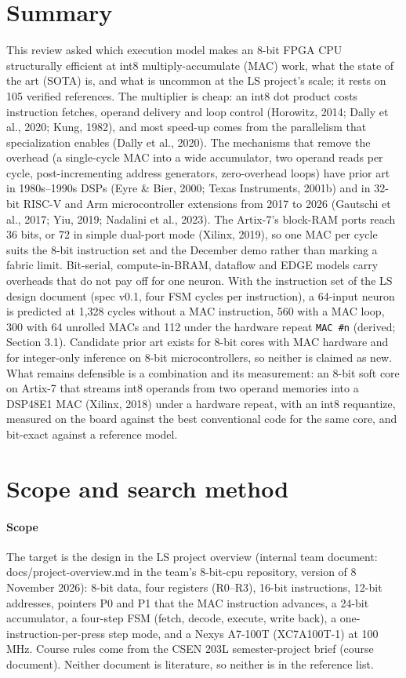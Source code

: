 
\section{Summary}

This review asked which execution model makes an 8-bit FPGA CPU structurally efficient at int8 multiply-accumulate (MAC) work, what the state of the art (SOTA) is, and what is uncommon at the LS project's scale; it rests on 105 verified references. The multiplier is cheap: an int8 dot product costs instruction fetches, operand delivery and loop control (Horowitz, 2014; Dally et al., 2020; Kung, 1982), and most speed-up comes from the parallelism that specialization enables (Dally et al., 2020). The mechanisms that remove the overhead (a single-cycle MAC into a wide accumulator, two operand reads per cycle, post-incrementing address generators, zero-overhead loops) have prior art in 1980s–1990s DSPs (Eyre \& Bier, 2000; Texas Instruments, 2001b) and in 32-bit RISC-V and Arm microcontroller extensions from 2017 to 2026 (Gautschi et al., 2017; Yiu, 2019; Nadalini et al., 2023). The Artix-7's block-RAM ports reach 36 bits, or 72 in simple dual-port mode (Xilinx, 2019), so one MAC per cycle suits the 8-bit instruction set and the December demo rather than marking a fabric limit. Bit-serial, compute-in-BRAM, dataflow and EDGE models carry overheads that do not pay off for one neuron. With the instruction set of the LS design document (spec v0.1, four FSM cycles per instruction), a 64-input neuron is predicted at 1,328 cycles without a MAC instruction, 560 with a MAC loop, 300 with 64 unrolled MACs and 112 under the hardware repeat \texttt{MAC \#n} (derived; Section 3.1). Candidate prior art exists for 8-bit cores with MAC hardware and for integer-only inference on 8-bit microcontrollers, so neither is claimed as new. What remains defensible is a combination and its measurement: an 8-bit soft core on Artix-7 that streams int8 operands from two operand memories into a DSP48E1 MAC (Xilinx, 2018) under a hardware repeat, with an int8 requantize, measured on the board against the best conventional code for the same core, and bit-exact against a reference model.

\section{Scope and search method}

\paragraph{Scope} The target is the design in the LS project overview (internal team document: docs/project-overview.md in the team's 8-bit-cpu repository, version of 8 November 2026): 8-bit data, four registers (R0–R3), 16-bit instructions, 12-bit addresses, pointers P0 and P1 that the MAC instruction advances, a 24-bit accumulator, a four-step FSM (fetch, decode, execute, write back), a one-instruction-per-press step mode, and a Nexys A7-100T (XC7A100T-1) at 100 MHz. Course rules come from the CSEN 203L semester-project brief (course document). Neither document is literature, so neither is in the reference list.

